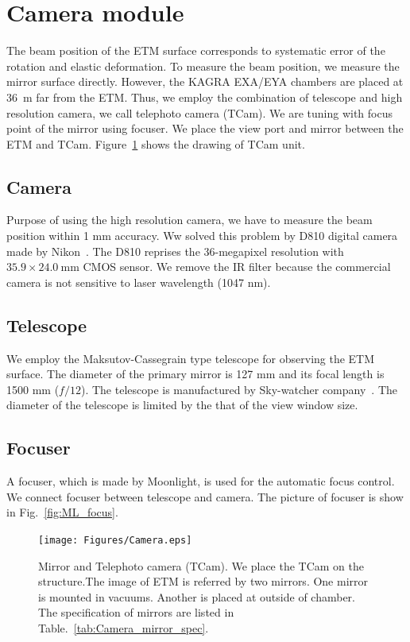 
\section{Camera module} \label{Tcam_inst}
The beam position of the ETM surface corresponds to systematic error of the rotation and elastic deformation. To measure the beam position, we measure the mirror surface directly. However, the KAGRA EXA/EYA chambers are placed at 36~m far from the ETM. Thus, we employ the combination of telescope and high resolution camera, we call telephoto camera (TCam). We are tuning with focus point of the mirror using focuser.  We place the view port and mirror between the ETM and TCam. Figure~\ref{fig:Camera} shows the drawing of TCam unit.

\subsection{Camera}
Purpose of using the high resolution camera, we have to measure the beam position within 1 mm accuracy. Ww solved this problem by D810 digital camera made by Nikon~\cite{Nikon}. The D810 reprises the 36-megapixel resolution with $35.9 \times 24.0~\mathrm{mm}$ CMOS sensor. We remove the IR filter because the commercial camera is not sensitive to laser wavelength (1047 nm).

\subsection{Telescope}
We employ the Maksutov-Cassegrain type telescope for observing the ETM surface. The diameter of the primary mirror is 127 mm and its focal length is 1500 mm ($f/12$). The telescope is manufactured by Sky-watcher company~\cite{Skywatcher}. The diameter of the telescope is limited by the that of the view window size. 

\subsection{Focuser}
A focuser, which is made by Moonlight, is used for the automatic focus control. 
We connect focuser between telescope and camera. 
The picture of focuser is show in Fig.~\ref{fig:ML_focus}.
\begin{figure}
\begin{center}
\texttt{[image: Figures/Camera.eps]}
\caption{Mirror and Telephoto camera (TCam). We place the TCam on the structure.The image of ETM is referred by two mirrors. One mirror is mounted in vacuums. Another is placed at outside of chamber. The specification of mirrors are listed in Table.~\ref{tab:Camera_mirror_spec}.} 
\label{fig:Camera} 
\end{center}
\end{figure}


